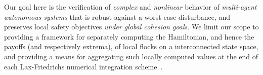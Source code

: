 %
Our goal here is the verification of  \textit{complex} and \textit{nonlinear} behavior of  \textit{multi-agent autonomous systems} that is robust against a worst-case disturbance, and preserves local safety objectives \textit{under global cohesion goals}. We limit our scope to providing a framework for separately computing the Hamiltonian, and hence the payoffs (and respectively extrema), of local flocks on a interconnected state space,   and providing a means for aggregating such locally computed values at the end of each Lax-Friedrichs numerical integration scheme~\cite{Crandall1984Approx, OsherShuENO}. %


